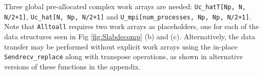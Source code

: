 \documentclass[11pt, oneside]{article}
\newcommand{\inpyth}{\lstinline[style=pythonstyle, basicstyle=\ttfamily]} %[]%
\begin{document}
Three global pre-allocated complex work arrays are needed: \inpyth{Uc_hatT[Np, N, N/2+1]},  \inpyth{Uc_hat[N, Np, N/2+1]} and \inpyth{U_mpi[num_processes, Np, Np, N/2+1]}.
Note that  \inpyth{Alltoall} requires two work arrays as placeholders, one for each of the data structures seen in Fig \ref{fig:Slabdecomp} (b) and (c). Alternatively, the data transfer may be performed without explicit work arrays using the in-place \inpyth{Sendrecv_replace} along with transpose operations, as shown in alternative versions of these functions in the appendix.

\begin{figure}[t!]
\end{figure}
\end{document}
